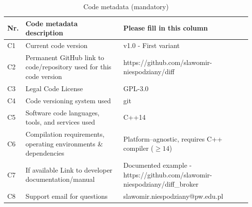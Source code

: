\documentclass[preprint,12pt, a4paper]{elsarticle}
\begin{document}
\begin{table}[!h]
    \begin{tabular}{|l|p{6.5cm}|p{6.5cm}|}
        \hline
        \textbf{Nr.} & \textbf{Code metadata description}                                  & \textbf{Please fill in this column}                                        \\
        \hline
        C1           & Current code version                                                & v1.0 - First variant                                                       \\
        \hline
        C2           & Permanent GitHub link to code/repository used for this code version & https://github.com/slawomir-niespodziany/diff                              \\
        \hline
        C3           & Legal Code License                                                  & GPL-3.0                                                                    \\
        \hline
        C4           & Code versioning system used                                         & git                                                                        \\
        \hline
        C5           & Software code languages, tools, and services used                   & C++14                                                                      \\
        \hline
        C6           & Compilation requirements, operating environments \& dependencies    & Platform--agnostic, requires C++ compiler ($\ge 14$)                       \\
        \hline
        C7           & If available Link to developer documentation/manual                 & Documented example - https://github.com/slawomir-niespodziany/diff\_broker \\
        \hline
        C8           & Support email for questions                                         & slawomir.niespodziany@pw.edu.pl                                            \\
        \hline
    \end{tabular}
    \caption{Code metadata (mandatory)}
    \label{}
\end{table}


\end{document}
